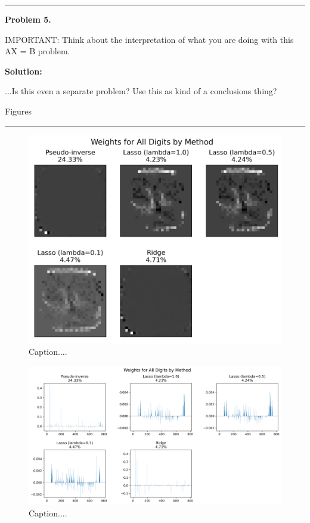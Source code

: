\documentclass[10pt]{article}
\begin{document}
\vskip 1cm
\hrule
{\bf Problem 5.}

IMPORTANT: Think about the interpretation of what you are doing with this AX = B problem.

{\bf Solution:} 

{\color{red} ...Is this even a separate problem? Use this as kind of a conclusions thing?}


\newpage
\centerline{\Large{Figures}}
\vskip 10pt
\hrule

\begin{figure}[ht]
\centerline{\includegraphics[scale=0.75]{figures/weights_matrix_accuracy_all_digits_all_methods.png}}
\caption{Caption....}
\label{fig1}
\end{figure}

\begin{figure}[ht]
\centerline{\includegraphics[scale=0.5]{figures/bar_plot_loadings_all_digits_all_methods.png}}
\caption{Caption....}
\label{fig2}
\end{figure}
\end{document}
